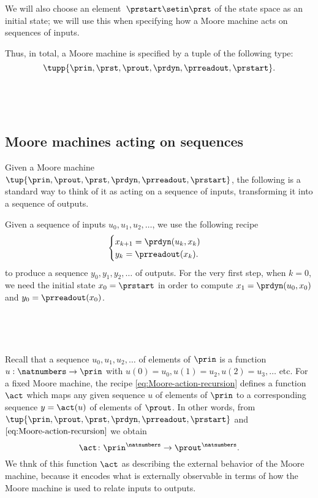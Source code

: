 We will also choose an element~$\prstart \setin \prst$ of the state space as an initial state; we will use this when specifying how a Moore machine acts on sequences of inputs.

Thus, in total, a Moore machine is specified by a tuple of the following type:
\begin{equation}
    \label{eq:moore-tuple}
    \tupp{\prin,\prst,\prout,\prdyn,\prreadout,\prstart}.
\end{equation}

\


\

\subsection{Moore machines acting on sequences}

Given a Moore machine $\tup{\prin, \prout, \prst, \prdyn, \prreadout, \prstart}$, the following is a standard way to think of it as acting on a sequence of inputs, transforming it into a sequence of outputs.

Given a sequence of inputs $u_0, u_1, u_2, \dots $, we use the following recipe
\begin{equation}
    \label{eq:Moore-action-recursion}
    \begin{cases}
        x_{k+1} = \prdyn(u_k, x_k) \\
        y_{k}   = \prreadout(x_{k}).
    \end{cases}
\end{equation}
to produce a sequence $y_0, y_1, y_2, \dots $ of outputs.
For the very first step, when $k = 0$, we need the initial state $x_0 = \prstart$ in order to compute $x_1 = \prdyn(u_0, x_0)$ and $y_0 = \prreadout(x_0)$.

\


\

Recall that a sequence $u_0, u_1, u_2, \dots$ of elements of $\prin$ is a function $u : \natnumbers \to \prin$ with $u(0) = u_0, u(1) = u_2, u(2) = u_3, \dots$ etc. For a fixed Moore machine, the recipe \cref{eq:Moore-action-recursion} defines a function $\act$ which maps any given sequence $u$ of elements of $\prin$ to a corresponding sequence $y = \act(u)$ of elements of $\prout$.
In other words, from $\tup{\prin, \prout, \prst, \prdyn, \prreadout, \prstart}$ and $\cref{eq:Moore-action-recursion}$ we obtain $$\act \colon \prin^\natnumbers \to \prout^\natnumbers.
$$ We thnk of this function $\act$ as describing the external behavior of the Moore machine, because it encodes what is externally observable in terms of how the Moore machine is used to relate inputs to outputs.

